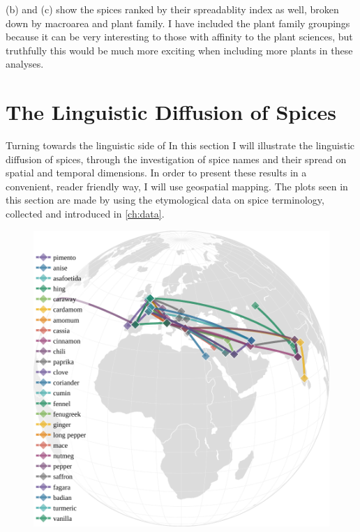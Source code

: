 

 (b) and (c) show the spices ranked by their spreadablity index as well, broken down by macroarea and plant family. I have included the plant family groupings because it can be very interesting to those with affinity to the plant sciences, but truthfully this would be much more exciting when including more plants in these analyses.

\section{The Linguistic Diffusion of Spices}

Turning towards the linguistic side of 
In this section I will illustrate the linguistic diffusion of spices, through the investigation of spice names and their spread on spatial and temporal dimensions. In order to present these results in a convenient, reader friendly way, I will use geospatial mapping. The plots seen in this section are made by using the etymological data on spice terminology, collected and introduced in \cref{ch:data}.



\begin{figure}[ht!]
    \includegraphics[width=\linewidth]{imgs/plots/diffusion_en.pdf}
    \caption{}
    \label{fig:diffusion_en}
\end{figure}

